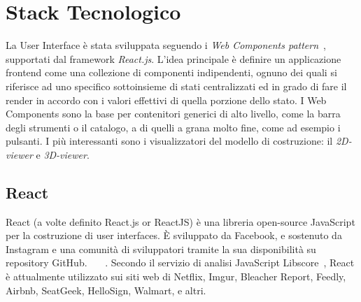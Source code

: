 \section{Stack Tecnologico}
\label{sec:chapter_2_section_3}

La User Interface è stata sviluppata seguendo i \emph{Web Components pattern}~\cite{web_components},
supportati dal framework \emph{React.js}.
L'idea principale è definire un applicazione frontend come una collezione di componenti indipendenti,
ognuno dei quali si riferisce ad uno specifico sottoinsieme di stati centralizzati ed in grado
di fare il render in accordo con i valori effettivi di quella porzione dello stato.
I Web Components sono la base per contenitori generici di alto livello, come la barra degli strumenti o il catalogo,
a di quelli a grana molto fine, come ad esempio i pulsanti. I più interessanti sono i visualizzatori del
modello di costruzione: il \emph{2D-viewer} e \emph{3D-viewer}.

%
\subsection{React}
\label{sec:chapter_2_section_3_sub_1}
React (a volte definito React.js or ReactJS) è una libreria open-source JavaScript per la costruzione di user interfaces.
\`E sviluppato da Facebook, e sostenuto da Instagram e una comunità di sviluppatori tramite la sua disponibilità su repository GitHub.
~\cite{infoworld}~\cite{facebookreact}~\cite{reactjs}. Secondo il servizio di analisi JavaScript Libscore~\cite{libscope},
React è attualmente utilizzato sui  siti web di Netflix, Imgur, Bleacher Report, Feedly, Airbnb, SeatGeek,
HelloSign, Walmart, e altri.


